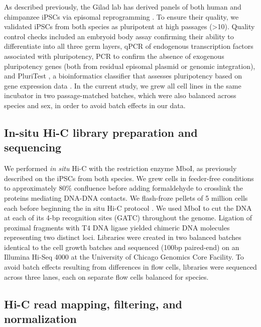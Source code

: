 As described previously, the Gilad lab has derived panels of both human and chimpanzee iPSCs via episomal reprogramming \cite{Romero.2015}. To ensure their quality, we validated iPSCs from both species as pluripotent at high passages ({\textgreater}10). Quality control checks included an embryoid body assay confirming their ability to differentiate into all three germ layers, qPCR of endogenous transcription factors associated with pluripotency, PCR to confirm the absence of exogenous pluripotency genes (both from residual episomal plasmid or genomic integration), and PluriTest \cite{Muller.2011}, a bioinformatics classifier that assesses pluripotency based on gene expression data \cite{Romero.2015}. In the current study, we grew all cell lines in the same incubator in two passage-matched batches, which were also balanced across species and sex, in order to avoid batch effects in our data.

\subsection{In-situ Hi-C library preparation and sequencing}
We performed \textit{in situ} Hi-C with the restriction enzyme MboI, as previously described \cite{Rao.2014} on the iPSCs from both species. We grew cells in feeder-free conditions \cite{Nakagawa.2014} to approximately 80\% confluence before adding formaldehyde to crosslink the proteins mediating DNA-DNA contacts. We flash-froze pellets of 5 million cells each before beginning the in situ Hi-C protocol \cite{Rao.2014}. We used MboI to cut the DNA at each of its 4-bp recognition sites (GATC) throughout the genome. Ligation of proximal fragments with T4 DNA ligase yielded chimeric DNA molecules representing two distinct loci. Libraries were created in two balanced batches identical to the cell growth batches and sequenced (100bp paired-end) on an Illumina Hi-Seq 4000 at the University of Chicago Genomics Core Facility. To avoid batch effects resulting from differences in flow cells, libraries were sequenced across three lanes, each on separate flow cells balanced for species.

\subsection{Hi-C read mapping, filtering, and normalization}

